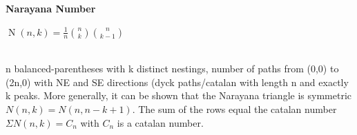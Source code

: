 \begin{large}
  \textbf{Narayana Number} \\
  \begin{Large}
    ${\displaystyle \operatorname {N} (n,k)={\frac {1}{n}}{n \choose k}{n \choose k-1}}$
  \end{Large} \\
  n balanced-parentheses with k distinct nestings, number of paths from (0,0) to (2n,0) with NE and SE directions (dyck paths/catalan with length n and exactly k peaks. More generally, it can be shown that the Narayana triangle is symmetric $N\left(n,k\right) = N\left(n,n-k+1\right)$. The sum of the rows equal the catalan number $\Sigma N\left(n,k\right) = C_n$ with $C_n$ is a catalan number.
\end{large} \\
